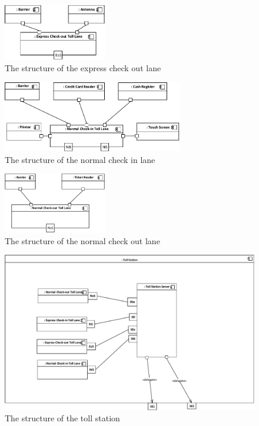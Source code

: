 \begin{figure}[H]
\centerline{\includegraphics[width=0.4\textwidth]{img/composite_structure_diagram/cscd_toll_lane_express_out}}
\caption{The structure of the express check out lane}
\label{fig:csd_tleo}
\end{figure}

\begin{figure}[H]
\centerline{\includegraphics[width=0.7\textwidth]{img/composite_structure_diagram/cscd_toll_lane_normal_in}}
\caption{The structure of the normal check in lane}
\label{fig:csd_tlni}
\end{figure}

\begin{figure}[H]
\centerline{\includegraphics[width=0.4\textwidth]{img/composite_structure_diagram/cscd_toll_lane_normal_out}}
\caption{The structure of the normal check out lane}
\label{fig:csd_tlno}
\end{figure}


\begin{figure}[H]
\centerline{\includegraphics[width=\textwidth]{img/composite_structure_diagram/cscd_toll_station}}
\caption{The structure of the toll station}
\label{fig:csd_ts}
\end{figure}
